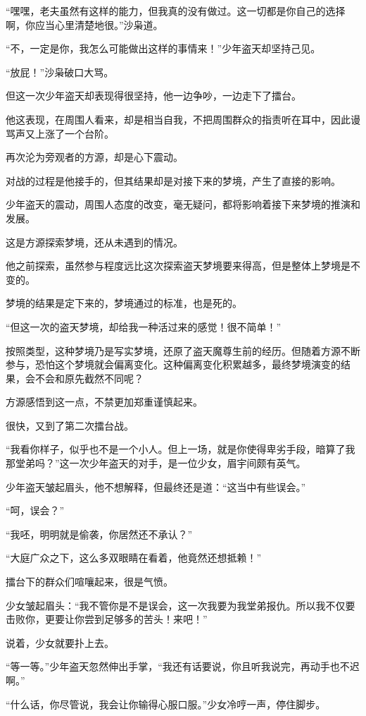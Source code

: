 \begin{this_body}
“嘿嘿，老夫虽然有这样的能力，但我真的没有做过。这一切都是你自己的选择啊，你应当心里清楚地很。”沙枭道。

“不，一定是你，我怎么可能做出这样的事情来！”少年盗天却坚持己见。

“放屁！”沙枭破口大骂。

但这一次少年盗天却表现得很坚持，他一边争吵，一边走下了擂台。

他这表现，在周围人看来，却是相当自我，不把周围群众的指责听在耳中，因此谩骂声又上涨了一个台阶。

再次沦为旁观者的方源，却是心下震动。

对战的过程是他接手的，但其结果却是对接下来的梦境，产生了直接的影响。

少年盗天的震动，周围人态度的改变，毫无疑问，都将影响着接下来梦境的推演和发展。

这是方源探索梦境，还从未遇到的情况。

他之前探索，虽然参与程度远比这次探索盗天梦境要来得高，但是整体上梦境是不变的。

梦境的结果是定下来的，梦境通过的标准，也是死的。

“但这一次的盗天梦境，却给我一种活过来的感觉！很不简单！”

按照类型，这种梦境乃是写实梦境，还原了盗天魔尊生前的经历。但随着方源不断参与，恐怕这个梦境就会偏离变化。这种偏离变化积累越多，最终梦境演变的结果，会不会和原先截然不同呢？

方源感悟到这一点，不禁更加郑重谨慎起来。

很快，又到了第二次擂台战。

“我看你样子，似乎也不是一个小人。但上一场，就是你使得卑劣手段，暗算了我那堂弟吗？”这一次少年盗天的对手，是一位少女，眉宇间颇有英气。

少年盗天皱起眉头，他不想解释，但最终还是道：“这当中有些误会。”

“呵，误会？”

“我呸，明明就是偷袭，你居然还不承认？”

“大庭广众之下，这么多双眼睛在看着，他竟然还想抵赖！”

擂台下的群众们喧嚷起来，很是气愤。

少女皱起眉头：“我不管你是不是误会，这一次我要为我堂弟报仇。所以我不仅要击败你，更要让你尝到足够多的苦头！来吧！”

说着，少女就要扑上去。

“等一等。”少年盗天忽然伸出手掌，“我还有话要说，你且听我说完，再动手也不迟啊。”

“什么话，你尽管说，我会让你输得心服口服。”少女冷哼一声，停住脚步。


\end{this_body}
